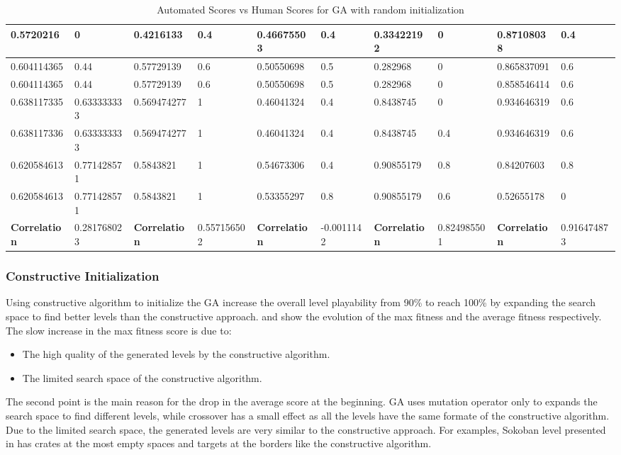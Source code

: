 \begin{landscape}
\begin{table}[!ht]
\begin{tabular}{|p{0.8in}|p{0.8in}|p{0.8in}|p{0.8in}|p{0.8in}|p{0.8in}|p{0.8in}|p{0.8in}|p{0.8in}|p{0.8in}|}
		\hline
		0.5720216 & 0 & 0.4216133 & 0.4 & 0.46675503 & 0.4 & 0.33422192 & 0 & 0.87108038 & 0.4\\
		\hline
		0.604114365 & 0.44 & 0.57729139 & 0.6 & 0.50550698 & 0.5 & 0.282968 & 0 & 0.865837091 & 0.6\\
		\hline
		0.604114365 & 0.44 & 0.57729139 & 0.6 & 0.50550698 & 0.5 & 0.282968 & 0 & 0.858546414 & 0.6\\
		\hline
		0.638117335 & 0.633333333 & 0.569474277 & 1 & 0.46041324 & 0.4 & 0.8438745 & 0 & 0.934646319 & 0.6\\
		\hline
		0.638117336 & 0.633333333 & 0.569474277 & 1 & 0.46041324 & 0.4 & 0.8438745 & 0.4 & 0.934646319 & 0.6\\
		\hline
		0.620584613 & 0.771428571 & 0.5843821 & 1 & 0.54673306 & 0.4 & 0.90855179 & 0.8 & 0.84207603 & 0.8\\
		\hline
		0.620584613 & 0.771428571 & 0.5843821 & 1 & 0.53355297 & 0.8 & 0.90855179 & 0.6 & 0.52655178 & 0\\
		\hline
		\textbf{Correlation} & 0.281768023 & \textbf{Correlation} & 0.557156502 & \textbf{Correlation} & -0.0011142 & \textbf{Correlation} & 0.824985501 & \textbf{Correlation} & 0.916474873\\
		\hline
	\end{tabular}
	\caption{Automated Scores vs Human Scores for GA with random initialization}
	\label{Table:randomScores}
\end{table}
\end{landscape}

\subsubsection{Constructive Initialization}
Using constructive algorithm to initialize the GA increase the overall level playability from 90\% to reach 100\% by expanding the search space to find better levels than the constructive approach.  and  show the evolution of the max fitness and the average fitness respectively. The slow increase in the max fitness score is due to:
\begin{itemize} \itemsep0pt \parskip0pt 
	\item The high quality of the generated levels by the constructive algorithm.
	\item The limited search space of the constructive algorithm.
\end{itemize}
The second point is the main reason for the drop in the average score at the beginning. GA uses mutation operator only to expands the search space to find different levels, while crossover has a small effect as all the levels have the same formate of the constructive algorithm. Due to the limited search space, the generated levels are very similar to the constructive approach. For examples, Sokoban level presented in  has crates at the most empty spaces and targets at the borders like the constructive algorithm.

